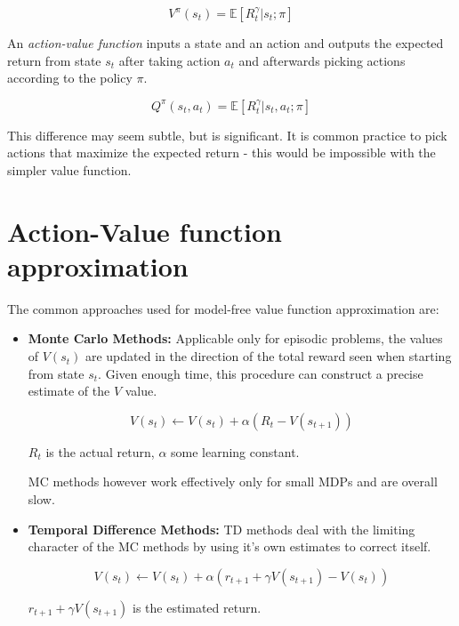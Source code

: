 \begin{equation}
V^\pi(s_t)=\mathbb{E}[R_t^\gamma|s_t;\pi]
\end{equation}

An \textit{action-value function} inputs a state and an action and outputs the expected return from state $s_t$ after taking action $a_t$ and afterwards picking actions according to the policy $\pi$.

\begin{equation}
Q^\pi(s_t,a_t)=\mathbb{E}[R_t^\gamma|s_t, a_t;\pi]
\end{equation}

This difference may seem subtle, but is significant. It is common practice to pick actions that maximize the expected return - this would be impossible with the simpler value function.

\section{Action-Value function approximation}

The common approaches used for model-free value function approximation are:

\begin{itemize}
\item \textbf{Monte Carlo Methods:} Applicable only for episodic problems, the values of $V(s_t)$ are updated in the direction of the total reward seen when starting from state $s_t$. Given enough time, this procedure can construct a precise estimate of the $V$ value.

\begin{equation}
V(s_t)\leftarrow V(s_t)+\alpha (R_t-V(s_{t+1}))
\end{equation}

$R_t$ is the actual return, $\alpha$ some learning constant.

MC methods however work effectively only for small MDPs and are overall slow.

\item \textbf{Temporal Difference Methods:} TD methods deal with the limiting character of the MC methods by using it's own estimates to correct itself.

\begin{equation}
V(s_t)\leftarrow V(s_t)+\alpha (r_{t+1}+\gamma V(s_{t+1})-V(s_t))
\end{equation}

$r_{t+1}+\gamma V(s_{t+1})$ is the estimated return.
\end{itemize}

